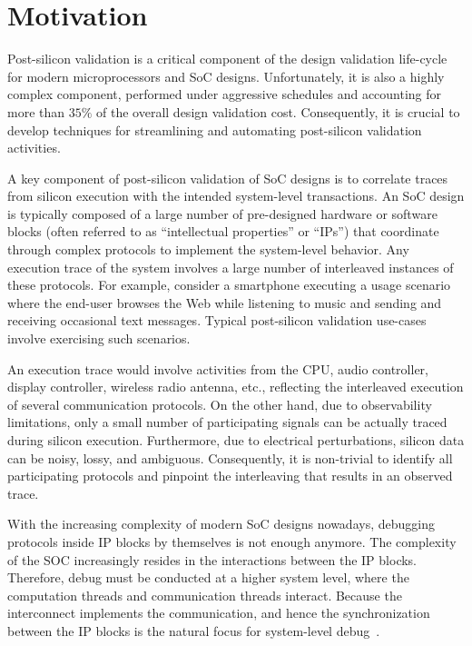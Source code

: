 \documentclass[12pt,frontmatter,copyright,thesis]{usfmanus}
\begin{document}
\section{Motivation}

Post-silicon validation is a critical
component of the design validation life-cycle for modern
microprocessors and SoC designs.  Unfortunately, it is also
a highly complex component, performed under aggressive
schedules and accounting for more than $35\%$ of the overall
design validation cost.  Consequently, it
is crucial to develop techniques for streamlining and
automating post-silicon validation activities.

A key component of post-silicon validation of SoC designs is
to correlate traces from silicon execution with the intended
system-level transactions.  An SoC design is typically
composed of a large number of pre-designed hardware or
software blocks (often referred to as ``intellectual
properties'' or ``IPs'') that coordinate through complex
protocols to implement the system-level behavior.  Any
execution trace of the system involves a large number of
interleaved instances of these protocols.  For example,
consider a smartphone executing a usage scenario where the
end-user browses the Web while listening to music and
sending and receiving occasional text messages. Typical
post-silicon validation use-cases involve exercising such
scenarios. 

 An execution trace would involve activities from
the CPU, audio controller, display controller, wireless
radio antenna, etc., reflecting the interleaved execution of
several communication protocols.  On the other hand, due to
observability limitations, only a small number of
participating signals can be actually traced during silicon
execution.  Furthermore, due to electrical perturbations,
silicon data can be noisy, lossy, and ambiguous.
Consequently, it is non-trivial to identify all
participating protocols and pinpoint the interleaving that
results in an observed trace.

With the increasing complexity of modern SoC designs nowadays, 
debugging protocols inside IP
blocks by themselves is not enough anymore. The complexity
of the SOC increasingly resides in the interactions between
the IP blocks. 
Therefore, debug must be conducted
at a higher system level, where the computation threads
and communication threads interact.
 Because the interconnect
implements the communication, and hence the synchronization
between the IP blocks is the natural focus for system-level
debug~\cite{Goossens2007NOCS}.
\end{document}
